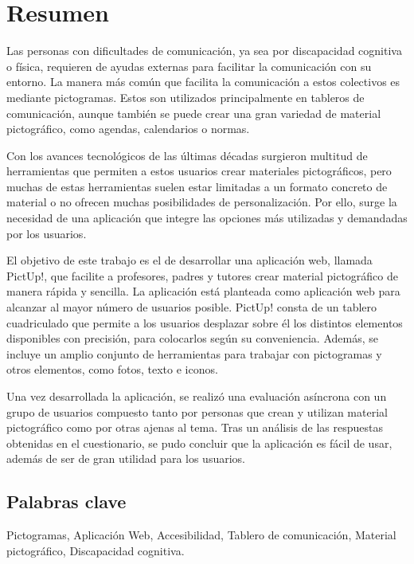 \chapter*{Resumen}

Las personas con dificultades de comunicación, ya sea por discapacidad cognitiva o física, requieren de ayudas externas para facilitar la comunicación con su entorno. La manera más común que facilita la comunicación a estos colectivos es mediante  pictogramas. Estos son utilizados principalmente en tableros de comunicación, aunque también se puede crear una gran variedad de material pictográfico, como agendas, calendarios o normas.

Con los avances tecnológicos de las últimas décadas surgieron multitud de herramientas que permiten a estos usuarios crear materiales pictográficos, pero muchas de estas herramientas suelen estar limitadas a un formato concreto de material o no ofrecen muchas posibilidades de personalización. Por ello, surge la necesidad de una aplicación que integre las opciones más utilizadas y demandadas por los usuarios. 

El objetivo de este trabajo es el de desarrollar una aplicación web, llamada PictUp!, que facilite a profesores, padres y tutores crear material pictográfico de manera rápida y sencilla. La aplicación está planteada como aplicación web para alcanzar al mayor número de usuarios posible. PictUp! consta de un tablero cuadriculado que permite a los usuarios desplazar sobre él los distintos elementos disponibles con precisión, para colocarlos según su conveniencia. Además, se incluye un amplio conjunto de herramientas para trabajar con pictogramas y otros elementos, como fotos, texto e iconos.

Una vez desarrollada la aplicación, se realizó una evaluación asíncrona con un grupo de usuarios compuesto tanto por personas que crean y utilizan material pictográfico como por otras ajenas al tema. Tras un análisis de las respuestas obtenidas en el cuestionario, se pudo concluir que la aplicación es fácil de usar, además de ser de gran utilidad para los usuarios.


\section*{Palabras clave}
   
\noindent Pictogramas, Aplicación Web, Accesibilidad, Tablero de comunicación, Material pictográfico, Discapacidad cognitiva. 

   


